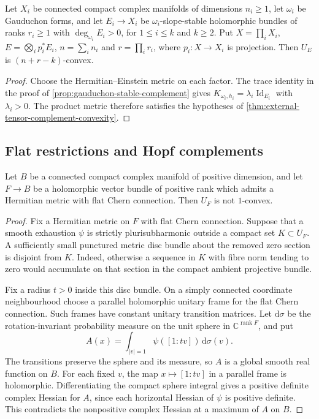 \begin{corollary}\label{cor:gauduchon-stable-factor-complement}
Let $X_i$ be connected compact complex manifolds of dimensions $n_i\geq1$, let $\omega_i$ be Gauduchon forms, and let $E_i\to X_i$ be $\omega_i$-slope-stable holomorphic bundles of ranks $r_i\geq1$ with $\deg_{\omega_i}E_i>0$, for $1\leq i\leq k$ and $k\geq2$. Put $X=\prod_iX_i$, $E=\bigotimes_ip_i^*E_i$, $n=\sum_in_i$ and $r=\prod_ir_i$, where $p_i:X\to X_i$ is projection. Then $U_E$ is $(n+r-k)$-convex.
\end{corollary}
\begin{proof}
Choose the Hermitian--Einstein metric on each factor. The trace identity in the proof of \cref{prop:gauduchon-stable-complement} gives $K_{\omega_i,h_i}=\lambda_i\operatorname{Id}_{E_i}$ with $\lambda_i>0$. The product metric therefore satisfies the hypotheses of \cref{thm:external-tensor-complement-convexity}.
\end{proof}

\subsection{Flat restrictions and Hopf complements}
\label{subsec:flat-restriction-hopf-complements}

\begin{lemma}\label{lem:unitary-flat-complement-obstruction}
Let $B$ be a connected compact complex manifold of positive dimension, and let $F\to B$ be a holomorphic vector bundle of positive rank which admits a Hermitian metric with flat Chern connection. Then $U_F$ is not $1$-convex.
\end{lemma}
\begin{proof}
Fix a Hermitian metric on $F$ with flat Chern connection. Suppose that a smooth exhaustion $\psi$ is strictly plurisubharmonic outside a compact set $K\subset U_F$. A sufficiently small punctured metric disc bundle about the removed zero section is disjoint from $K$. Indeed, otherwise a sequence in $K$ with fibre norm tending to zero would accumulate on that section in the compact ambient projective bundle.

Fix a radius $t>0$ inside this disc bundle. On a simply connected coordinate neighbourhood choose a parallel holomorphic unitary frame for the flat Chern connection. Such frames have constant unitary transition matrices. Let $\mathrm d\sigma$ be the rotation-invariant probability measure on the unit sphere in $\mathbb C^{\operatorname{rank}F}$, and put
\[
 A(x)=\int_{|v|=1}\psi([1:tv])\,\mathrm d\sigma(v).
\]
The transitions preserve the sphere and its measure, so $A$ is a global smooth real function on $B$. For each fixed $v$, the map $x\mapsto[1:tv]$ in a parallel frame is holomorphic. Differentiating the compact sphere integral gives a positive definite complex Hessian for $A$, since each horizontal Hessian of $\psi$ is positive definite. This contradicts the nonpositive complex Hessian at a maximum of $A$ on $B$.
\end{proof}

